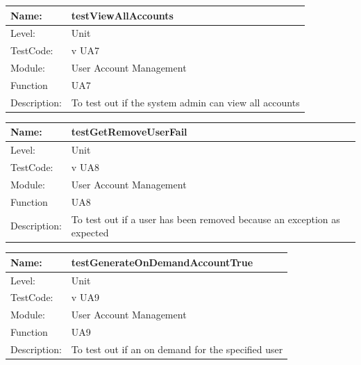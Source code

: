 \documentclass[12pt]{article}
\begin{document}
\begin{center}
\begin{tabular}{|l|p{12cm}|}
\hline

 Name: & testViewAllAccounts \\
\hline
Level: & Unit \\
\hline
TestCode: & v UA7 \\
\hline
Module:& User Account Management\\
\hline
Function & UA7 \\
\hline
Description: & To test out if the system admin can view all accounts \\
\hline

\end{tabular}
\end{center}

\begin{center}
\begin{tabular}{|l|p{12cm}|}
\hline

 Name: & testGetRemoveUserFail \\
\hline
Level: & Unit \\
\hline
TestCode: & v UA8 \\
\hline
Module:& User Account Management\\
\hline
Function & UA8 \\
\hline
Description: & To test out if a user has been removed because an exception as expected \\
\hline

\end{tabular}
\end{center}

\begin{center}
\begin{tabular}{|l|p{12cm}|}
\hline

 Name: & testGenerateOnDemandAccountTrue\\
\hline
Level: & Unit \\
\hline
TestCode: & v UA9 \\
\hline
Module:& User Account Management\\
\hline
Function & UA9 \\
\hline
Description: & To test out if an on demand for the specified user \\
\hline

\end{tabular}
\end{center}
\end{document}
